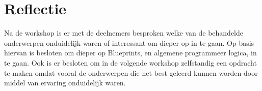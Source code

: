 \section{Reflectie}
Na de workshop is er met de deelnemers besproken welke van de behandelde onderwerpen onduidelijk waren of interessant om dieper op in te gaan. Op basis hiervan is besloten om dieper op Blueprints, en algemene programmeer logica, in te gaan. Ook is er besloten om in de volgende workshop zelfstandig een opdracht te maken omdat vooral de onderwerpen die het best geleerd kunnen worden door middel van ervaring onduidelijk waren.